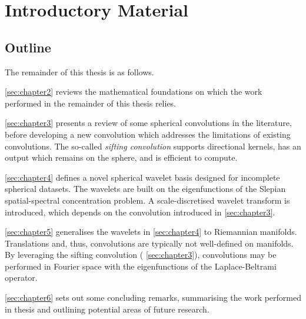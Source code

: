 \chapter{Introductory Material}\label{sec:chapter1}

\section{Outline}

The remainder of this thesis is as follows.

\begin{hangparas}{24pt}{1}
    \cref{sec:chapter2} reviews the mathematical foundations on which the work performed in the remainder of this thesis relies.

    \cref{sec:chapter3} presents a review of some spherical convolutions in the literature, before developing a new convolution which addresses the limitations of existing convolutions.
    The so-called \emph{sifting convolution} supports directional kernels, has an output which remains on the sphere, and is efficient to compute.

    \cref{sec:chapter4} defines a novel spherical wavelet basis designed for incomplete spherical datasets.
    The wavelets are built on the eigenfunctions of the Slepian spatial-spectral concentration problem.
    A scale-discretised wavelet transform is introduced, which depends on the convolution introduced in \cref{sec:chapter3}.

    \cref{sec:chapter5} generalises the wavelets in \cref{sec:chapter4} to Riemannian manifolds.
    Translations and, thus, convolutions are typically not well-defined on manifolds.
    By leveraging the sifting convolution (\cf{} \cref{sec:chapter3}), convolutions may be performed in Fourier space with the eigenfunctions of the Laplace-Beltrami operator.

    \cref{sec:chapter6} sets out some concluding remarks, summarising the work performed in thesis and outlining potential areas of future research.
\end{hangparas}
